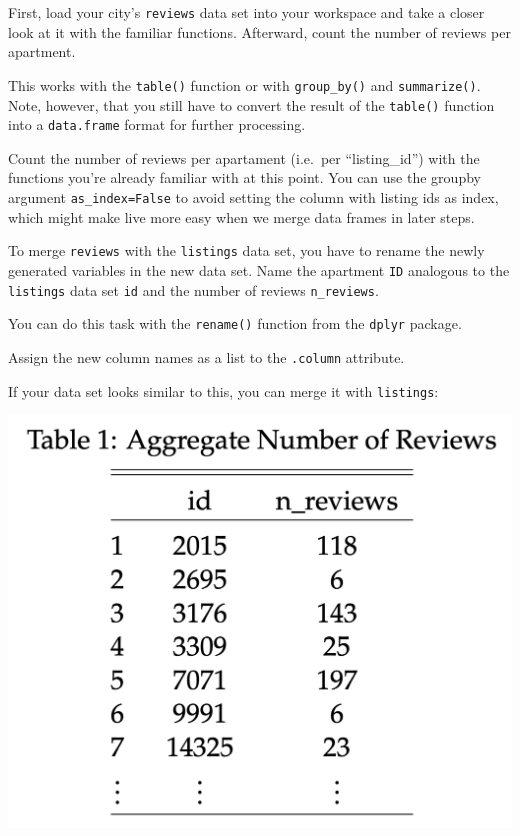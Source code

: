 \documentclass[
  11pt,
]{article}
\newenvironment{tips}[1]
  {
  \begin{itemize}
  \footnotesize
  \renewcommand{\labelitemi}{
    \raisebox{-.7\height}[0pt][0pt]{
      {\setkeys{Gin}{width=3em,keepaspectratio}
        \texttt{[image: images/\#1.png]}}
    }
  }
  \setlength{\fboxsep}{1em}
  \begin{rbox}
  \item
  }
  {
  \end{rbox}
  \end{itemize}
  }
\newenvironment{tipsp}[1]
  {
  \begin{itemize}
  \footnotesize
  \renewcommand{\labelitemi}{
    \raisebox{-.7\height}[0pt][0pt]{
      {\setkeys{Gin}{width=3em,keepaspectratio}
        \texttt{[image: images/\#1.png]}}
    }
  }
  \setlength{\fboxsep}{1em}
  \begin{pbox}
  \item
  }
  {
  \end{pbox}
  \end{itemize}
  }
\begin{document}
First, load your city's \texttt{reviews} data set into your workspace and take a closer look at it with the familiar functions.
Afterward, count the number of reviews per apartment.

\begin{tips}r
This works with the \texttt{table()} function or with \texttt{group\_by()} and \texttt{summarize()}.
Note, however, that you still have to convert the result of the \texttt{table()} function into a \texttt{data.frame} format for further processing.

\end{tips}

\begin{tipsp}p
Count the number of reviews per apartament (i.e.~per ``listing\_id'') with the functions you're already familiar with at this point.
You can use the groupby argument \texttt{as\_index=False} to avoid setting the column with listing ids as index, which might make live more easy when we merge data frames in later steps.

\end{tipsp}

To merge \texttt{reviews} with the \texttt{listings} data set, you have to rename the newly generated variables in the new data set.
Name the apartment \texttt{ID} analogous to the \texttt{listings} data set \texttt{id} and the number of reviews \texttt{n\_reviews}.

\begin{tips}r
You can do this task with the \texttt{rename()} function from the \texttt{dplyr} package.

\end{tips}

\begin{tipsp}p
Assign the new column names as a list to the \texttt{.column} attribute.

\end{tipsp}

If your data set looks similar to this, you can merge it with \texttt{listings}:

\begin{center}\includegraphics[width=0.4\linewidth]{plot/2_merging_table} \end{center}
\end{document}

